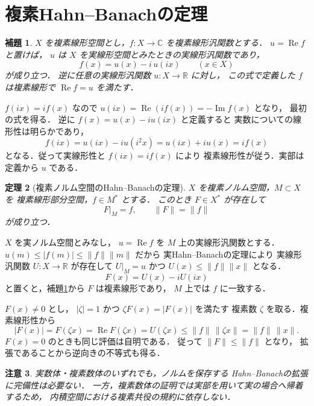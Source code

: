\documentclass[a5paper,10pt,onecolumn]{jsarticle}
\makeatletter
\theoremstyle{mathnotetheorem}
\newtheorem{theorem}{定理}[section]
\newtheorem{lemma}[theorem]{補題}
\newtheorem{remark}[theorem]{注意}
\renewcommand{\proofname}{証明}
\renewenvironment{proof}[1][\proofname]{%
  \par\pushQED{\qed}\normalfont\topsep4\p@\@plus2\p@\relax
  \trivlist\item[\hskip\labelsep\bfseries #1]\ignorespaces
}{\popQED\endtrivlist\@endpefalse}
\makeatother
\begin{document}
\section{複素Hahn--Banachの定理}

\begin{lemma}\label{lem:realpart}
$X$ を複素線形空間とし，$f:X\to\mathbb C$
を複素線形汎関数とする．
$u=\operatorname{Re}f$ と置けば，
$u$ は $X$ を実線形空間とみたときの実線形汎関数であり，
\[
 f(x)=u(x)-i\,u(ix)\qquad(x\in X)
\]
が成り立つ．
逆に任意の実線形汎関数 $u:X\to\mathbb R$ に対し，
この式で定義した $f$ は複素線形で
$\operatorname{Re}f=u$ を満たす．
\end{lemma}
\begin{proof}
$f(ix)=if(x)$ なので
$u(ix)=\operatorname{Re}(if(x))=-\operatorname{Im}f(x)$ となり，
最初の式を得る．
逆に $f(x)=u(x)-iu(ix)$ と定義すると
実数についての線形性は明らかであり，
\[
 f(ix)=u(ix)-iu(i^2x)
 =u(ix)+iu(x)=if(x)
\]
となる．従って実線形性と $f(ix)=if(x)$ により
複素線形性が従う．実部は定義から $u$ である．
\end{proof}

\begin{theorem}[複素ノルム空間のHahn--Banachの定理]\label{thm:hb-complex}
$X$ を複素ノルム空間，$M\subset X$ を
複素線形部分空間，$f\in M^*$ とする．
このとき $F\in X^*$ が存在して
\[
 F|_M=f,\qquad \|F\|=\|f\|
\]
が成り立つ．
\end{theorem}
\begin{proof}
$X$ を実ノルム空間とみなし，
$u=\operatorname{Re}f$ を $M$ 上の実線形汎関数とする．
$u(m)\le|f(m)|\le\|f\|\|m\|$ だから
実Hahn--Banachの定理により
実線形汎関数 $U:X\to\mathbb R$ が存在して
$U|_M=u$ かつ
$U(x)\le\|f\|\|x\|$ となる．
\[
 F(x)=U(x)-iU(ix)
\]
と置くと，補題\ref{lem:realpart}から $F$ は複素線形であり，
$M$ 上では $f$ に一致する．

$F(x)\ne0$ とし，
$|\zeta|=1$ かつ $\zeta F(x)=|F(x)|$ を満たす
複素数 $\zeta$ を取る．複素線形性から
\[
 |F(x)|=F(\zeta x)=\operatorname{Re}F(\zeta x)
 =U(\zeta x)\le\|f\|\,\|\zeta x\|
 =\|f\|\,\|x\|.
\]
$F(x)=0$ のときも同じ評価は自明である．
従って $\|F\|\le\|f\|$ となり，
拡張であることから逆向きの不等式も得る．
\end{proof}

\begin{remark}
実数体・複素数体のいずれでも，ノルムを保存する
Hahn--Banachの拡張に完備性は必要ない．
一方，複素数体の証明では実部を用いて実の場合へ帰着するため，
内積空間における複素共役の規約に依存しない．
\end{remark}
\end{document}
